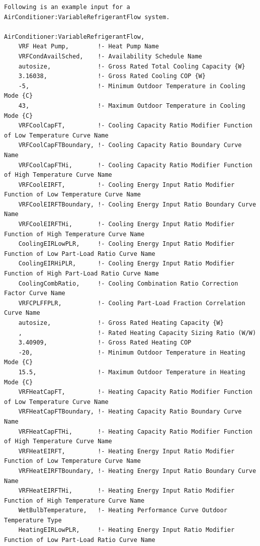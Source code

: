 \begin{lstlisting}
Following is an example input for a AirConditioner:VariableRefrigerantFlow system.

AirConditioner:VariableRefrigerantFlow,
    VRF Heat Pump,        !- Heat Pump Name
    VRFCondAvailSched,    !- Availability Schedule Name
    autosize,             !- Gross Rated Total Cooling Capacity {W}
    3.16038,              !- Gross Rated Cooling COP {W}
    -5,                   !- Minimum Outdoor Temperature in Cooling Mode {C}
    43,                   !- Maximum Outdoor Temperature in Cooling Mode {C}
    VRFCoolCapFT,         !- Cooling Capacity Ratio Modifier Function of Low Temperature Curve Name
    VRFCoolCapFTBoundary, !- Cooling Capacity Ratio Boundary Curve Name
    VRFCoolCapFTHi,       !- Cooling Capacity Ratio Modifier Function of High Temperature Curve Name
    VRFCoolEIRFT,         !- Cooling Energy Input Ratio Modifier Function of Low Temperature Curve Name
    VRFCoolEIRFTBoundary, !- Cooling Energy Input Ratio Boundary Curve Name
    VRFCoolEIRFTHi,       !- Cooling Energy Input Ratio Modifier Function of High Temperature Curve Name
    CoolingEIRLowPLR,     !- Cooling Energy Input Ratio Modifier Function of Low Part-Load Ratio Curve Name
    CoolingEIRHiPLR,      !- Cooling Energy Input Ratio Modifier Function of High Part-Load Ratio Curve Name
    CoolingCombRatio,     !- Cooling Combination Ratio Correction Factor Curve Name
    VRFCPLFFPLR,          !- Cooling Part-Load Fraction Correlation Curve Name
    autosize,             !- Gross Rated Heating Capacity {W}
    ,                     !- Rated Heating Capacity Sizing Ratio (W/W)
    3.40909,              !- Gross Rated Heating COP
    -20,                  !- Minimum Outdoor Temperature in Heating Mode {C}
    15.5,                 !- Maximum Outdoor Temperature in Heating Mode {C}
    VRFHeatCapFT,         !- Heating Capacity Ratio Modifier Function of Low Temperature Curve Name
    VRFHeatCapFTBoundary, !- Heating Capacity Ratio Boundary Curve Name
    VRFHeatCapFTHi,       !- Heating Capacity Ratio Modifier Function of High Temperature Curve Name
    VRFHeatEIRFT,         !- Heating Energy Input Ratio Modifier Function of Low Temperature Curve Name
    VRFHeatEIRFTBoundary, !- Heating Energy Input Ratio Boundary Curve Name
    VRFHeatEIRFTHi,       !- Heating Energy Input Ratio Modifier Function of High Temperature Curve Name
    WetBulbTemperature,   !- Heating Performance Curve Outdoor Temperature Type
    HeatingEIRLowPLR,     !- Heating Energy Input Ratio Modifier Function of Low Part-Load Ratio Curve Name

\end{lstlisting}
